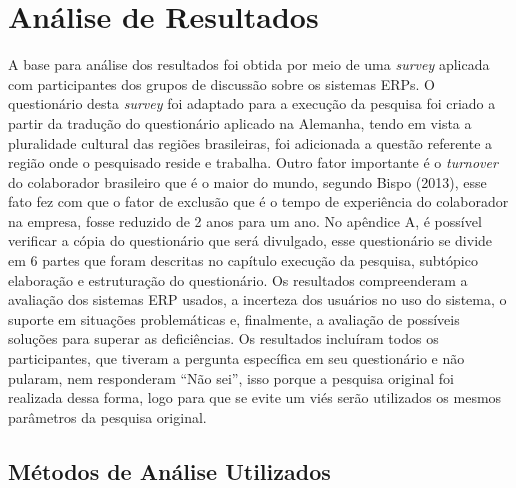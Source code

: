 \chapter{Análise de Resultados} \label{Análise de Resultados}

A base para análise dos resultados foi obtida por meio de uma \textit{survey} aplicada com participantes dos grupos de discussão sobre os sistemas ERPs.\newline
\indent O questionário desta \textit{survey} foi adaptado para a execução da pesquisa foi criado a partir da tradução do questionário aplicado na Alemanha, tendo em vista a pluralidade cultural das regiões brasileiras, foi adicionada a questão referente a região onde o pesquisado reside e trabalha.\newline
\indent Outro fator importante é o \textit{turnover} do colaborador brasileiro que é o maior do mundo, segundo Bispo (2013), esse fato fez com que o fator de exclusão que é o tempo de experiência do colaborador na empresa, fosse reduzido de 2 anos para um ano.\newline
\indent No apêndice A, é possível verificar a cópia do questionário que será divulgado, esse questionário se divide em 6 partes que foram descritas no capítulo execução da pesquisa, subtópico elaboração e estruturação do questionário.\newline
\indent Os resultados compreenderam a avaliação dos sistemas ERP usados, a incerteza dos usuários no uso do sistema, o suporte em situações problemáticas e, finalmente, a avaliação de possíveis soluções para superar as deficiências.\newline
\indent Os resultados incluíram todos os participantes, que tiveram a pergunta específica em seu questionário e não pularam, nem responderam “Não sei”, isso porque a pesquisa original foi realizada dessa forma, logo para que se evite um viés serão utilizados os mesmos parâmetros da pesquisa original. 

\section{Métodos de Análise Utilizados} \label{Métodos de Análise Utilizados}

